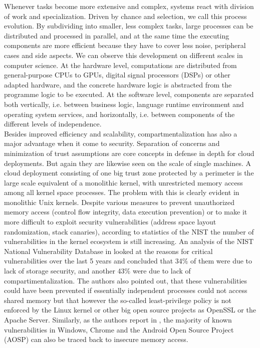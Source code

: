 
Whenever tasks become more extensive and complex, systems react with division of work and specialization. Driven by chance and selection, we call this process evolution. By subdividing into smaller, less complex tasks, large processes can be distributed and processed in parallel, and at the same time the executing components are more efficient because they have to cover less noise, peripheral cases and side aspects. We can observe this development on different scales in computer science. At the hardware level, computations are distributed from general-purpose CPUs to GPUs, digital signal processors (DSPs) or other adapted hardware, and the concrete hardware logic is abstracted from the programme logic to be executed. At the software level, components are separated both vertically, i.e. between business logic, language runtime environment and operating system services, and horizontally, i.e. between components of the different levels of independence. \\

Besides improved efficiency and scalability, compartmentalization has also a major advantage when it come to security. Separation of concerns and minimization of trust assumptions are core concepts in defense in depth for cloud deployments. But again they are likewise seen on the scale of single machines. A cloud deployment consisting of one big trust zone protected by a perimeter is the large scale equivalent of a monolithic kernel, with unrestricted memory access among all kernel space processes. The problem with this is clearly evident in monolithic Unix kernels. Despite various measures to prevent unauthorized memory access (control flow integrity, data execution prevention) or to make it more difficult to exploit security vulnerabilities (address space layout randomization, stack canaries), according to statistics of the NIST\cite{nvd} the number of vulnerabilities in the kernel ecosystem is still increasing. An analysis of the NIST National Vulnerability Database in \cite{mckee2022novel} looked at the reasons for critical vulnerabilities over the last 5 years and concluded that 34\% of them were due to lack of storage security, and another 43\% were due to lack of compartimentalization. The authors also pointed out, that these vulnerabilities could have been prevented if essentially independent processes could not access shared memory but that however the so-called least-privilege policy is not enforced by the Linux kernel or other big open source projects as OpenSSL or the Apache Server. 
Similarly, as the authors report in \cite{kirth2022pkru}, the majority of known vulnerabilities in Windows, Chrome and the Android Open Source Project (AOSP) can also be traced back to insecure memory access. \\

